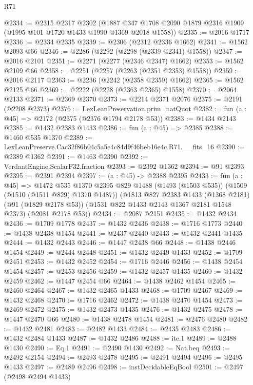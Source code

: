 \begin{lexlean}{R71}
\begin{coremodule}
@2334 := @2315
    @2317
    @2302
    (@1887 @347 @1708 @2090 @1879 @2316 @1909 (@1995 @101 @1720 @1433 @1990 @1369 @2018 @1558))
@2335 := @2016 @1717
@2336 := @2334 @2335
@2339 := @2306 (@2312 @2336 @1662)
@2341 := @1562 @2093 @66
@2346 := @2286 (@2292 (@2298 (@2339 @2341) @1558))
@2347 := @2016 @2101
@2351 := @2271 (@2277 (@2346 @2347) @1662)
@2353 := @1562 @2109 @66
@2358 := @2251 (@2257 (@2263 (@2351 @2353) @1558))
@2359 := @2016 @2117
@2363 := @2236 (@2242 (@2358 @2359) @1662)
@2365 := @1562 @2125 @66
@2369 := @2222 (@2228 (@2363 @2365) @1558)
@2370 := @2064 @2133
@2371 := @2369 @2370
@2373 := @2214 @2371 @2076
@2375 := @2191 (@2208 @2373)
@2376 := LexLeanPreservation.prim_natQuot
@2382 := fun (a : @45) => @2172 (@2375 (@2376 @1794 @2178 @53))
@2383 := @1434 @2143
@2385 := @1432 @2383 @1433
@2386 := fun (a : @45) => @2385
@2388 := @1460 @535 @1370
@2389 := LexLeanPreserve.Cac32f86b04c5a5e4c84d9f46beb16e4c.R71.__fits_16
@2390 := @2389 @1362
@2391 := @1463 @2390
@2392 := VerdantEngine.ScalarF32.fraction
@2393 := @2392 @1362
@2394 := @91 @2393
@2395 := @2391 @2394
@2397 := (a : @45) -> @2388 @2395
@2433 := fun (a : @45) =>
  @1472
    @535
    @1370
    @2395
    @829
    @1488
    (@1493 (@1503 @535))
    (@1509 (@1510 (@1511 @829) @1370 @1487))
    (@1813
      @827
      @2383
      @1433
      (@1368 @2181)
      (@91 (@1829 @2178 @53))
      (@1531 @822 @1433 @2143 @1367 @2181 @1548 @2373)
      (@2081 @2178 @53))
@2434 := @2087 @2151
@2435 := @1432 @2434
@2436 := @1709 @1778
@2437 := @1432 @2436
@2438 := @1716 @1773
@2440 := @1438 @2438 @1454
@2441 := @2437 @2440
@2443 := @1432 @2441 @1435
@2444 := @1432 @2443
@2446 := @1447 @2438 @66
@2448 := @1438 @2446 @1454
@2449 := @2444 @2448
@2451 := @1432 @2449 @1433
@2452 := @1709 @2451
@2453 := @1432 @2452
@2454 := @1716 @2446
@2456 := @1438 @2454 @1454
@2457 := @2453 @2456
@2459 := @1432 @2457 @1435
@2460 := @1432 @2459
@2462 := @1447 @2454 @66
@2464 := @1438 @2462 @1454
@2465 := @2460 @2464
@2467 := @1432 @2465 @1433
@2468 := @1709 @2467
@2469 := @1432 @2468
@2470 := @1716 @2462
@2472 := @1438 @2470 @1454
@2473 := @2469 @2472
@2475 := @1432 @2473 @1435
@2476 := @1432 @2475
@2478 := @1447 @2470 @66
@2480 := @1438 @2478 @1454
@2481 := @2476 @2480
@2482 := @1432 @2481
@2483 := @2482 @1433
@2484 := @2435 @2483
@2486 := @1432 @2484 @1433
@2487 := @1432 @2486
@2488 := ite.{1}
@2489 := @2488 @1430
@2490 := Eq.{1}
@2491 := @2490 @1430
@2492 := Nat.beq
@2493 := @2492 @2154
@2494 := @2493 @2478
@2495 := @2491 @2494
@2496 := @2495 @1433
@2497 := @2489 @2496
@2498 := instDecidableEqBool
@2501 := @2497 (@2498 @2494 @1433)

\end{coremodule}
\end{lexlean}
